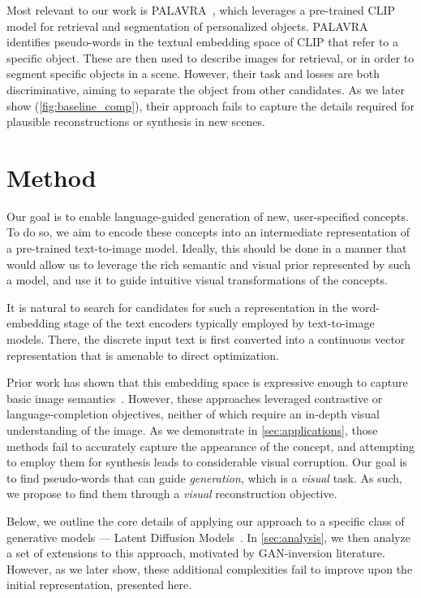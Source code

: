 Most relevant to our work is PALAVRA~\citep{cohen2022my}, which leverages a pre-trained CLIP model for retrieval and segmentation of personalized objects. PALAVRA identifies pseudo-words in the textual embedding space of CLIP that refer to a specific object. These are then used to describe images for retrieval, or in order to segment specific objects in a scene. However, their task and losses are both discriminative, aiming to separate the object from other candidates. As we later show (\ref{fig:baseline_comp}), their approach fails to capture the details required for plausible reconstructions or synthesis in new scenes.

\section{Method}
\label{sec:method}

Our goal is to enable language-guided generation of new, user-specified concepts. To do so, we aim to encode these concepts into an intermediate representation of a pre-trained text-to-image model. Ideally, this should be done in a manner that would allow us to leverage the rich semantic and visual prior represented by such a model, and use it to guide intuitive visual transformations of the concepts.

It is natural to search for candidates for such a representation in the word-embedding stage of the text encoders typically employed by text-to-image models. There, the discrete input text is first converted into a continuous vector representation that is amenable to direct optimization.

Prior work has shown that this embedding space is expressive enough to capture basic image semantics~\citep{cohen2022my,tsimpoukelli2021multimodal}. However, these approaches leveraged contrastive or language-completion objectives, neither of which require an in-depth visual understanding of the image. As we demonstrate in \ref{sec:applications}, those methods fail to accurately capture the appearance of the concept, and attempting to employ them for synthesis leads to considerable visual corruption. Our goal is to find pseudo-words that can guide \textit{generation}, which is a \textit{visual} task. As such, we propose to find them through a \textit{visual} reconstruction objective. 

Below, we outline the core details of applying our approach to a specific class of generative models --- Latent Diffusion Models~\citep{rombach2021highresolution}. In \ref{sec:analysis}, we then analyze a set of extensions to this approach, motivated by GAN-inversion literature. However, as we later show, these additional complexities fail to improve upon the initial representation, presented here. 

